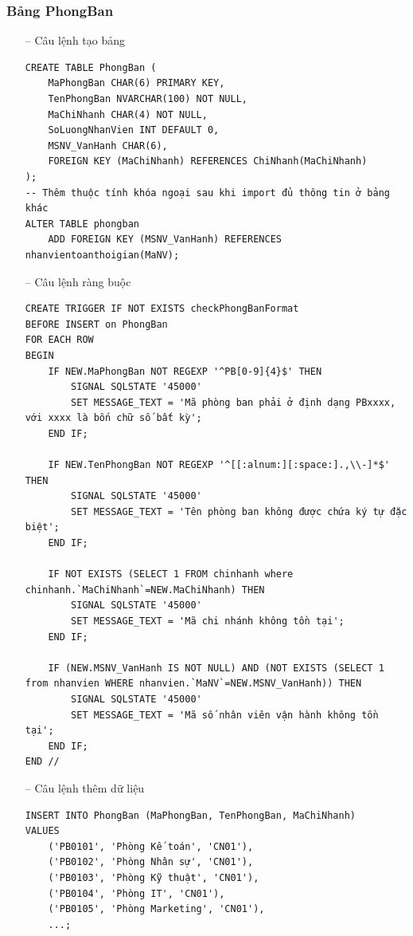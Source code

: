 \subsubsection{Bảng PhongBan}
\begin{itemize}
    \item [--] Câu lệnh tạo bảng
   \begin{verbatim}
CREATE TABLE PhongBan (
    MaPhongBan CHAR(6) PRIMARY KEY,
    TenPhongBan NVARCHAR(100) NOT NULL,
    MaChiNhanh CHAR(4) NOT NULL,
    SoLuongNhanVien INT DEFAULT 0,
    MSNV_VanHanh CHAR(6),
    FOREIGN KEY (MaChiNhanh) REFERENCES ChiNhanh(MaChiNhanh)
);
-- Thêm thuộc tính khóa ngoại sau khi import đủ thông tin ở bảng khác
ALTER TABLE phongban
    ADD FOREIGN KEY (MSNV_VanHanh) REFERENCES nhanvientoanthoigian(MaNV);
    \end{verbatim}
    \newpage
    \item [--] Câu lệnh ràng buộc
    \begin{verbatim}
CREATE TRIGGER IF NOT EXISTS checkPhongBanFormat
BEFORE INSERT on PhongBan
FOR EACH ROW
BEGIN 
    IF NEW.MaPhongBan NOT REGEXP '^PB[0-9]{4}$' THEN
        SIGNAL SQLSTATE '45000'
        SET MESSAGE_TEXT = 'Mã phòng ban phải ở định dạng PBxxxx, với xxxx là bốn chữ số bất kỳ';
    END IF;

    IF NEW.TenPhongBan NOT REGEXP '^[[:alnum:][:space:].,\\-]*$' THEN 
        SIGNAL SQLSTATE '45000'
        SET MESSAGE_TEXT = 'Tên phòng ban không được chứa ký tự đặc biệt';
    END IF;

    IF NOT EXISTS (SELECT 1 FROM chinhanh where chinhanh.`MaChiNhanh`=NEW.MaChiNhanh) THEN 
        SIGNAL SQLSTATE '45000'
        SET MESSAGE_TEXT = 'Mã chi nhánh không tồn tại';
    END IF;

    IF (NEW.MSNV_VanHanh IS NOT NULL) AND (NOT EXISTS (SELECT 1 from nhanvien WHERE nhanvien.`MaNV`=NEW.MSNV_VanHanh)) THEN
        SIGNAL SQLSTATE '45000'
        SET MESSAGE_TEXT = 'Mã số nhân viên vận hành không tồn tại';
    END IF;
END //
    \end{verbatim}
    \newpage
    \item [--] Câu lệnh thêm dữ liệu
   \begin{verbatim}
INSERT INTO PhongBan (MaPhongBan, TenPhongBan, MaChiNhanh)
VALUES
    ('PB0101', 'Phòng Kế toán', 'CN01'),
    ('PB0102', 'Phòng Nhân sự', 'CN01'),
    ('PB0103', 'Phòng Kỹ thuật', 'CN01'),
    ('PB0104', 'Phòng IT', 'CN01'),
    ('PB0105', 'Phòng Marketing', 'CN01'),
    ...;


\end{verbatim}
\end{itemize}
